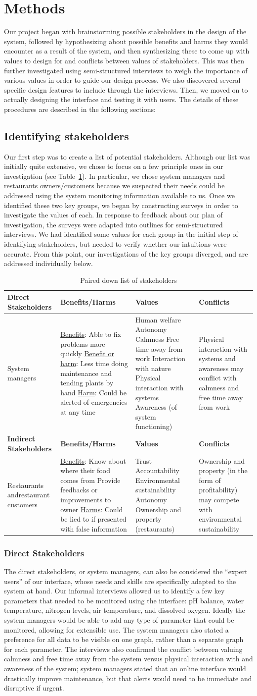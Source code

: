 \documentclass{sigchi}
\newcommand\tabhead[1]{\small\textbf{#1}}
\newcommand{\stakeholdertable}{
\begin{table}
  \centering
  	\begin{tabularx}{0.9\textwidth}{|X|X|X|X|}
    \hline
    \tabhead{Direct Stakeholders} & \tabhead{Benefits/Harms} & \tabhead{Values} & \tabhead{Conflicts} \\
    \hline
    System managers & 
		\underline{Benefits}: Able to fix problems more quickly\newline
		\underline{Benefit or harm}: Less time doing maintenance and tending plants by hand\newline
		\underline{Harm}: Could be alerted of emergencies at any time
	&	Human welfare\newline
	 	Autonomy\newline
		Calmness\newline
		Free time away from work\newline
		Interaction with nature\newline
		Physical interaction with systems\newline
		Awareness (of system functioning)
	& Physical interaction with systems and awareness may conflict with calmness and free time away from work \\
    \hline
    \tabhead{Indirect Stakeholders} & \tabhead{Benefits/Harms} & \tabhead{Values} & \tabhead{Conflicts} \\
    \hline
    Restaurants and\newline restaurant customers &
		\underline{Benefits}: Know about where their food comes from\newline
		Provide feedbacks or improvements to owner\newline
		\underline{Harms}: Could be lied to if presented with false information
	&	Trust\newline
		Accountability\newline
		Environmental sustainability\newline
		Autonomy\newline
		Ownership and property (restaurants)
	&	Ownership and property (in the form of profitability) may compete with environmental sustainability\\
    \hline
  \end{tabularx}
  \caption{Paired down list of stakeholders}
  \label{tab:stakeholders}
\end{table}}
\begin{document}
\section{Methods}

Our project began with brainstorming possible stakeholders in the design of the system, followed by hypothesizing about possible benefits and harms they would encounter as a result of the system, and then synthesizing these to come up with values to design for and conflicts between values of stakeholders. This was then further investigated using semi-structured interviews to weigh the importance of various values in order to guide our design process. We also discovered several specific design features to include through the interviews. Then, we moved on to actually designing the interface and testing it with users. The details of these procedures are described in the following sections:

\subsection{Identifying stakeholders}

Our first step was to create a list of potential stakeholders. Although our list was initially quite extensive, we chose to focus on a few principle ones in our investigation (see Table~\ref{tab:stakeholders}). In particular, we chose system managers and restaurants owners/customers because we suspected their needs could be addressed using the system monitoring information available to us. Once we identified these two key groups, we began by constructing surveys in order to investigate the values of each. In response to feedback about our plan of investigation, the surveys were adapted into outlines for semi-structured interviews. We had identified some values for each group in the initial step of identifying stakeholders, but needed to verify whether our intuitions were accurate. From this point, our investigations of the key groups diverged, and are addressed individually below. 
\stakeholdertable

\subsubsection{Direct Stakeholders}

The direct stakeholders, or system managers, can also be considered the ``expert users'' of our interface, whose needs and skills are specifically adapted to the system at hand. Our informal interviews allowed us to identify a few key parameters that needed to be monitored using the interface: pH balance, water temperature, nitrogen levels, air temperature, and dissolved oxygen. Ideally the system managers would be able to add any type of parameter that could be monitored, allowing for extensible use. The system managers also stated a preference for all data to be visible on one graph, rather than a separate graph for each parameter. The interviews also confirmed the conflict between valuing calmness and free time away from the system versus physical interaction with and awareness of the system; system managers stated that an online interface would drastically improve maintenance, but that alerts would need to be immediate and disruptive if urgent. 
\end{document}
